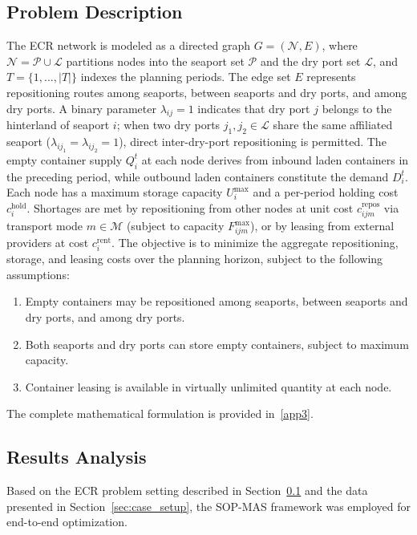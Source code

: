 \documentclass[preprint,12pt]{elsarticle}
\begin{document}
\subsection{Problem Description}\label{sec:problem_description}

The ECR network is modeled as a directed graph $G=(\mathcal{N},E)$, where $\mathcal{N}=\mathcal{P}\cup\mathcal{L}$ partitions nodes into the seaport set $\mathcal{P}$ and the dry port set $\mathcal{L}$, and $T=\{1,\ldots,|T|\}$ indexes the planning periods. The edge set $E$ represents repositioning routes among seaports, between seaports and dry ports, and among dry ports. A binary parameter $\lambda_{ij}=1$ indicates that dry port $j$ belongs to the hinterland of seaport $i$; when two dry ports $j_1,j_2\in\mathcal{L}$ share the same affiliated seaport ($\lambda_{ij_1}=\lambda_{ij_2}=1$), direct inter-dry-port repositioning is permitted. The empty container supply $Q_i^t$ at each node derives from inbound laden containers in the preceding period, while outbound laden containers constitute the demand $D_i^t$. Each node has a maximum storage capacity $U_i^{\max}$ and a per-period holding cost $c_i^\text{hold}$. Shortages are met by repositioning from other nodes at unit cost $c_{ijm}^\text{repos}$ via transport mode $m\in\mathcal{M}$ (subject to capacity $F_{ijm}^{\max}$), or by leasing from external providers at cost $c_i^\text{rent}$. The objective is to minimize the aggregate repositioning, storage, and leasing costs over the planning horizon, subject to the following assumptions:

\begin{enumerate}[label=\arabic*)]
 \item Empty containers may be repositioned among seaports, between seaports and dry ports, and among dry ports.
 \item Both seaports and dry ports can store empty containers, subject to maximum capacity.
 \item Container leasing is available in virtually unlimited quantity at each node.
\end{enumerate}

The complete mathematical formulation is provided in~\ref{app3}.

\subsection{Results Analysis}\label{sec:results_analysis}

Based on the ECR problem setting described in Section~\ref{sec:problem_description} and the data presented in Section~\ref{sec:case_setup}, the SOP-MAS framework was employed for end-to-end optimization.
\end{document}

